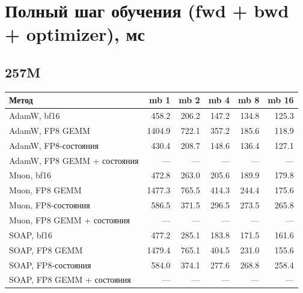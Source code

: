 \documentclass[10pt]{article}
\begin{document}
\section{Полный шаг обучения (fwd + bwd + optimizer), мс}
\subsection{257M}
\begin{center}
\small
\begin{tabular}{lrrrrr}
\toprule
\textbf{Метод} & \textbf{mb 1} & \textbf{mb 2} & \textbf{mb 4} & \textbf{mb 8} & \textbf{mb 16} \\
\midrule
AdamW, bf16 & 458.2 & 206.2 & 147.2 & 134.8 & 125.3 \\
AdamW, FP8 GEMM & 1404.9 & 722.1 & 357.2 & 185.6 & 118.9 \\
AdamW, FP8-состояния & 430.4 & 208.7 & 148.6 & 136.4 & 127.1 \\
AdamW, FP8 GEMM + состояния & --- & --- & --- & --- & --- \\
Muon, bf16 & 472.8 & 263.0 & 205.6 & 189.9 & 179.8 \\
Muon, FP8 GEMM & 1477.3 & 765.5 & 414.3 & 244.4 & 175.6 \\
Muon, FP8-состояния & 586.5 & 371.5 & 296.5 & 273.5 & 265.8 \\
Muon, FP8 GEMM + состояния & --- & --- & --- & --- & --- \\
SOAP, bf16 & 477.2 & 285.1 & 183.8 & 171.5 & 161.6 \\
SOAP, FP8 GEMM & 1479.4 & 765.1 & 404.5 & 231.0 & 155.6 \\
SOAP, FP8-состояния & 584.0 & 374.1 & 277.6 & 268.8 & 258.4 \\
SOAP, FP8 GEMM + состояния & --- & --- & --- & --- & --- \\
\bottomrule
\end{tabular}
\end{center}
\end{document}
